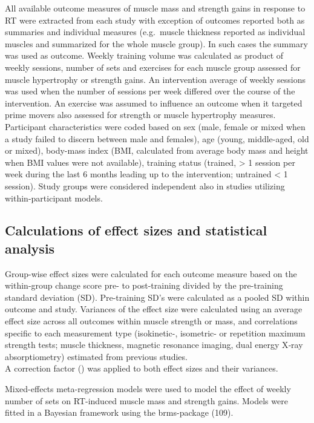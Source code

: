 \documentclass[twoside,10pt]{gihclass} %
\begin{document}
All available outcome measures of muscle mass and strength gains in
response to RT were extracted from each study with exception of outcomes
reported both as summaries and individual measures (e.g.~muscle
thickness reported as individual muscles and summarized for the whole
muscle group). In such cases the summary was used as outcome. Weekly
training volume was calculated as product of weekly sessions, number of
sets and exercises for each muscle group assessed for muscle hypertrophy
or strength gains. An intervention average of weekly sessions was used
when the number of sessions per week differed over the course of the
intervention. An exercise was assumed to influence an outcome when it
targeted prime movers also assessed for strength or muscle hypertrophy
measures. Participant characteristics were coded based on sex (male,
female or mixed when a study failed to discern between male and
females), age (young, middle-aged, old or mixed), body-mass index (BMI,
calculated from average body mass and height when BMI values were not
available), training status (trained, \textgreater{} 1 session per week during the
last 6 months leading up to the intervention; untrained \textless{} 1 session).
Study groups were considered independent also in studies utilizing
within-participant models.

\hypertarget{calculations-of-effect-sizes-and-statistical-analysis}{%
\subsection{Calculations of effect sizes and statistical analysis}\label{calculations-of-effect-sizes-and-statistical-analysis}}

Group-wise effect sizes were calculated for each outcome measure based
on the within-group change score pre- to post-training divided by the
pre-training standard deviation (SD). Pre-training SD's were calculated
as a pooled SD within outcome and study. Variances of the effect size
were calculated using an average effect size across all outcomes within
muscle strength or mass, and correlations specific to each measurement
type (isokinetic-, isometric- or repetition maximum strength tests;
muscle thickness, magnetic resonance imaging, dual energy X‐ray
absorptiometry) estimated from previous studies.\\
A correction factor () was applied to both effect sizes and their
variances.

Mixed-effects meta-regression models were used to model the effect of
weekly number of sets on RT-induced muscle mass and strength gains.
Models were fitted in a Bayesian framework using the brms-package
(109).
\end{document}
